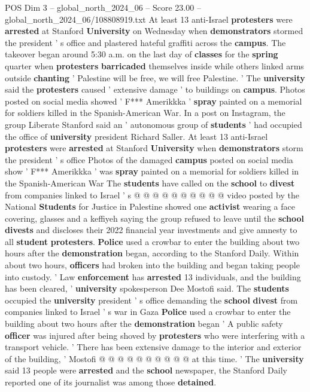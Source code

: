 \begin{textsample}{POS Dim 3 – global\_north\_2024\_06 – Score 23.00 – global\_north\_2024\_06/108808919.txt}  \label{ex:f3_pos_064}
At least 13 anti-Israel \textbf{protesters} were \textbf{arrested} at Stanford \textbf{University} on Wednesday when \textbf{demonstrators} stormed the president ' s office and plastered hateful graffiti across the \textbf{campus}.
The takeover began around 5:30 a.m. on the last day of \textbf{classes} for the \textbf{spring} quarter when \textbf{protesters} \textbf{barricaded} themselves inside while others linked arms outside \textbf{chanting} ' Palestine will be free, we will free Palestine. ' The \textbf{university} said the \textbf{protesters} caused ' extensive damage ' to buildings on \textbf{campus}.
Photos posted on social media showed ' F*** Amerikkka ' \textbf{spray} painted on a memorial for soldiers killed in the Spanish-American War.
In a post on Instagram, the group Liberate Stanford said an ' autonomous group of \textbf{students} ' had occupied the office of \textbf{university} president Richard Saller.
At least 13 anti-Israel \textbf{protesters} were \textbf{arrested} at Stanford \textbf{University} when \textbf{demonstrators} storm the president ' s office Photos of the damaged \textbf{campus} posted on social media show ' F*** Amerikkka ' was \textbf{spray} painted on a memorial for soldiers killed in the Spanish-American War The \textbf{students} have called on the \textbf{school} to \textbf{divest} from companies linked to Israel ' s @ @ @ @ @ @ @ @ @ @ video posted by the National \textbf{Students} for Justice in Palestine showed one \textbf{activist} wearing a face covering, glasses and a keffiyeh saying the group refused to leave until the \textbf{school} \textbf{divests} and discloses their 2022 financial year investments and give amnesty to all \textbf{student} \textbf{protesters}. \textbf{Police} used a crowbar to enter the building about two hours after the \textbf{demonstration} began, according to the Stanford Daily.
Within about two hours, \textbf{officers} had broken into the building and began taking people into custody. ' Law \textbf{enforcement} has \textbf{arrested} 13 individuals, and the building has been cleared, ' \textbf{university} spokesperson Dee Mostofi said.
The \textbf{students} occupied the \textbf{university} president ' s office demanding the \textbf{school} \textbf{divest} from companies linked to Israel ' s war in Gaza \textbf{Police} used a crowbar to enter the building about two hours after the \textbf{demonstration} began ' A public safety \textbf{officer} was injured after being shoved by \textbf{protesters} who were interfering with a transport vehicle. ' There has been extensive damage to the interior and exterior of the building, ' Mostofi @ @ @ @ @ @ @ @ @ @ at this time. ' The \textbf{university} said 13 people were \textbf{arrested} and the \textbf{school} newspaper, the Stanford Daily reported one of its journalist was among those \textbf{detained}.

\end{textsample}
